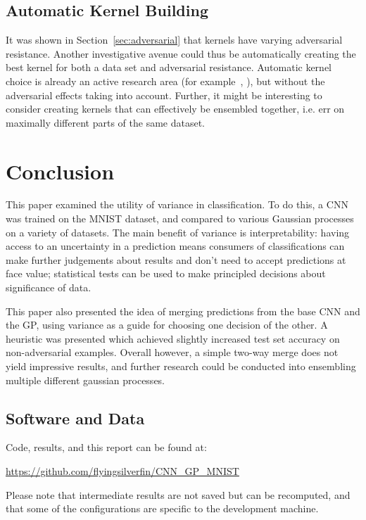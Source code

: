 \documentclass{article}
\begin{document}
\subsection{Automatic Kernel Building}
It was shown in Section~\ref{sec:adversarial} that kernels have varying adversarial resistance. Another investigative avenue could thus be automatically creating the best kernel for both a data set and adversarial resistance. Automatic kernel choice is already an active research area (for example~\cite{abdessalem2017automatic}, \cite{duvenaud2014automatic}), but without the adversarial effects taking into account. Further, it might be interesting to consider creating kernels that can effectively be ensembled together, i.e. err on maximally different parts of the same dataset.

\section{Conclusion}

This paper examined the utility of variance in classification. To do this, a CNN was trained on the MNIST dataset, and compared to various Gaussian processes on a variety of datasets. The main benefit of variance is interpretability: having access to an uncertainty in a prediction means consumers of classifications can make further judgements about results and don't need to accept predictions at face value; statistical tests can be used to make principled decisions about significance of data.

This paper also presented the idea of merging predictions from the base CNN and the GP, using variance as a guide for choosing one decision of the other. A heuristic was presented which achieved slightly increased test set accuracy on non-adversarial examples. Overall however, a simple two-way merge does not yield impressive results, and further research could be conducted into ensembling multiple different gaussian processes.

\subsection{Software and Data}

Code, results, and this report can be found at:

\url{https://github.com/flyingsilverfin/CNN_GP_MNIST}

Please note that intermediate results are not saved but can be recomputed, and that some of the configurations are specific to the development machine. %







\appendix
\end{document}

